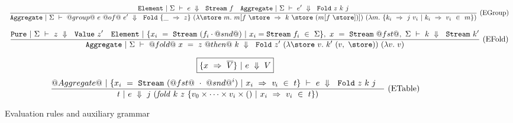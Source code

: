 \begin{figure*}
$$
\ruleIN
{
  \SourceStepXE{\Sigma}{e}{\VStream{f}}
  \quad
  \SourceStepXA{\Sigma}{e'}{\VFold{z}{k}{j}}
}
{
  \SourceStepXA{\Sigma}
    {@group@~e~@of@~e'}
    {\VFold
      {\{\_~\Rightarrow~z\}}
      {(\lam{\store~m}
        m[f~\store~\Rightarrow~k~\store~(m[f~\store])])}
      {(\lam{m}
        \{k_i~\Rightarrow~j~v_i~|~k_i~\Rightarrow~v_i~\in~m\})}}
}{EGroup}
$$

$$
\ruleIN
{
  \SourceStepXP{\Sigma}{z}{\VValue{z'}}
  \quad
  \SourceStepXE{\{x_i~=~\VStream{(f_i \cdot @snd@)}~|~x_i=\VStream{f_i}~\in~\Sigma\},~x~=~\VStream{@fst@},~\Sigma}{k}{\VStream{k'}}
}
{
  \SourceStepXA{\Sigma}
    {@fold@~x~=~z~@then@~k}
    {\VFold
      {z'}
      {(\lam{\store~v} k'~(v,~\store))}
      {(\lam{v} v)}}
}{EFold}
$$

$$
\boxed{\{x~\Rightarrow~\overline{V}\}~|~e~\Downarrow~V}
$$
$$
\enskip \frac {\displaystyle 
  @Aggregate@~|~\{x_i~=~\texttt{Stream}~(@fst@~\cdot~@snd@^i)~|~x_i~\Rightarrow~\mathit{v}_i~\in~t\}~\vdash~e~\Downarrow~~\texttt{Fold}~z~k~j
  \quad
} {\displaystyle 
  t~|~e~\Downarrow~
  j~(\mathit{fold}~k~z~\{v_0 \times \cdots \times v_i \times ()~|~x_i~\Rightarrow~v_i~\in~t\})
} \  \mbox{(ETable)} \enskip
$$

\caption{Evaluation rules and auxiliary grammar}
\label{icicle:fig:source:eval}
\end{figure*}


